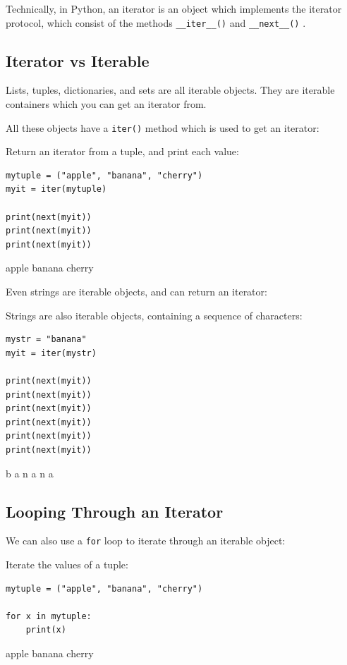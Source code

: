 \documentclass[12pt,a4paper]{article}
\newcommand{\code}[1]{%
	\colorbox{backcolour}{\lstinline{#1}}%
}
\begin{document}
Technically, in Python, an iterator is an object which implements the
iterator protocol, which consist of the methods \code{__iter__()} and
\code{__next__()}.

\subsection{Iterator vs Iterable}

Lists, tuples, dictionaries, and sets are all iterable objects. They are
iterable containers which you can get an iterator from.

All these objects have a \code{iter()} method which is used to get an
iterator:

\begin{ebox}
Return an iterator from a tuple, and print each value:
	\begin{lstlisting}
mytuple = ("apple", "banana", "cherry")
myit = iter(mytuple)

print(next(myit))
print(next(myit))
print(next(myit))
	\end{lstlisting}
\tcblower
	\begin{vercode}
apple
banana
cherry
	\end{vercode}
\end{ebox}

Even strings are iterable objects, and can return an iterator:

\begin{ebox}
Strings are also iterable objects, containing a sequence of characters:
	\begin{lstlisting}
mystr = "banana"
myit = iter(mystr)

print(next(myit))
print(next(myit))
print(next(myit))
print(next(myit))
print(next(myit))
print(next(myit))
	\end{lstlisting}
\tcblower
	\begin{vercode}
b
a
n
a
n
a
	\end{vercode}
\end{ebox}
\subsection{Looping Through an Iterator}

We can also use a \code{for} loop to iterate through an iterable object:

\begin{ebox}
Iterate the values of a tuple:
	\begin{lstlisting}
mytuple = ("apple", "banana", "cherry")

for x in mytuple:
    print(x)
	\end{lstlisting}
\tcblower
	\begin{vercode}
apple
banana
cherry
	\end{vercode}
\end{ebox}
\end{document}
